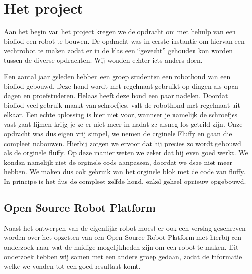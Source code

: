 \chapter{Het project}
Aan het begin van het project kregen we de opdracht om met behulp van een bioliod een robot te bouwen. De opdracht was in eerste instantie om hiervan een vechtrobot te maken zodat er in de klas een ``gevecht'' gehouden kon worden tussen de diverse opdrachten. Wij wouden echter iets anders doen.

Een aantal jaar geleden hebben een groep studenten een robothond van een bioliod gebouwd. Deze hond wordt met regelmaat gebruikt op dingen als open dagen en proefstuderen. Helaas heeft deze hond een paar nadelen. Doordat bioliod veel gebruik maakt van schroefjes, valt de robothond met regelmaat uit elkaar. Een echte oplossing is hier niet voor, wanneer je namelijk de schroefjes vast gaat lijmen krijg je ze er niet meer in nadat ze alsnog los getrild zijn. Onze opdracht was dus eigen vrij simpel, we nemen de orginele Fluffy en gaan die compleet nabouwen. Hierbij zorgen we ervoor dat hij precies zo wordt gebouwd als de orginele fluffy. Op deze manier weten we zeker dat hij even goed werkt. We konden namelijk niet de orginele code aanpassen, doordat we deze niet meer hebben. We maken dus ook gebruik van het orginele blok met de code van fluffy. In principe is het dus de compleet zelfde hond, enkel geheel opnieuw opgebouwd.

\section{Open Source Robot Platform}
Naast het ontwerpen van de eigenlijke robot moest er ook een verslag geschreven worden over het opzetten van een Open Source Robot Platform met hierbij een onderzoek naar wat de huidige mogelijkheden zijn om een robot te maken. Dit onderzoek hebben wij samen met een andere groep gedaan, zodat de informatie welke we vonden tot een goed resultaat komt. 
